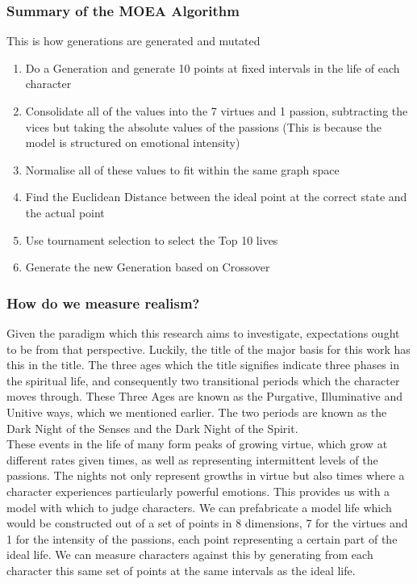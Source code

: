 \documentclass[11pt]{article}
\begin{document}
\subsubsection{Summary of the MOEA Algorithm}
This is how generations are generated and mutated\:
\begin{enumerate}
	\item Do a Generation and generate 10 points at fixed intervals in the life of each character
	\item Consolidate all of the values into the 7 virtues and 1 passion, subtracting the vices but taking the absolute values of the passions (This is because the model is structured on emotional intensity)
	\item Normalise all of these values to fit within the same graph space
	\item Find the Euclidean Distance between the ideal point at the correct state and the actual point
	\item Use tournament selection to select the Top 10 lives
	\item Generate the new Generation based on Crossover
\end{enumerate}

\subsubsection{How do we measure realism?}
Given the paradigm which this research aims to investigate, expectations ought to be from that perspective. Luckily, the title of the major basis for this work has this in the title. The three ages which the title signifies indicate three phases in the spiritual life, and consequently two transitional periods which the character moves through. These Three Ages are known as the Purgative, Illuminative and Unitive ways, which we mentioned earlier. The two periods are known as the Dark Night of the Senses and the Dark Night of the Spirit. \\
These events in the life of many form peaks of growing virtue, which grow at different rates given times, as well as representing intermittent levels of the passions. The nights not only represent growths in virtue but also times where a character experiences particularly powerful emotions. This provides us with a model with which to judge characters. We can prefabricate a model life which would be constructed out of a set of points in 8 dimensions, 7 for the virtues and 1 for the intensity of the passions, each point representing a certain part of the ideal life. We can measure characters against this by generating from each character this same set of points at the same intervals as the ideal life. \\
\end{document}
